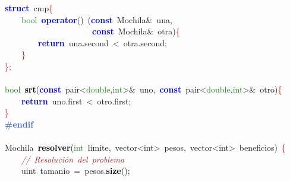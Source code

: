 \mbox{}\textbf{\textcolor{Blue}{struct}}\ \textcolor{TealBlue}{cmp}\textcolor{Red}{\{} \\
\mbox{}\ \ \ \ \textcolor{ForestGreen}{bool}\ \textbf{\textcolor{Blue}{operator}}\textcolor{BrickRed}{()}\ \textcolor{BrickRed}{(}\textbf{\textcolor{Blue}{const}}\ Mochila\textcolor{BrickRed}{\&}\ una\textcolor{BrickRed}{,}\  \\
\mbox{}\ \ \ \ \ \ \ \ \ \ \ \ \ \ \ \ \ \ \ \ \ \textbf{\textcolor{Blue}{const}}\ Mochila\textcolor{BrickRed}{\&}\ otra\textcolor{BrickRed}{)}\textcolor{Red}{\{} \\
\mbox{}\ \ \ \ \ \ \ \ \textbf{\textcolor{Blue}{return}}\ una\textcolor{BrickRed}{.}second\ \textcolor{BrickRed}{\textless{}}\ otra\textcolor{BrickRed}{.}second\textcolor{BrickRed}{;} \\
\mbox{}\ \ \ \ \textcolor{Red}{\}} \\
\mbox{}\textcolor{Red}{\}}\textcolor{BrickRed}{;} \\
\mbox{} \\
\mbox{}\textcolor{ForestGreen}{bool}\ \textbf{\textcolor{Black}{srt}}\textcolor{BrickRed}{(}\textbf{\textcolor{Blue}{const}}\ pair\textcolor{BrickRed}{\textless{}}\textcolor{ForestGreen}{double}\textcolor{BrickRed}{,}\textcolor{ForestGreen}{int}\textcolor{BrickRed}{\textgreater{}\&}\ uno\textcolor{BrickRed}{,}\ \textbf{\textcolor{Blue}{const}}\ pair\textcolor{BrickRed}{\textless{}}\textcolor{ForestGreen}{double}\textcolor{BrickRed}{,}\textcolor{ForestGreen}{int}\textcolor{BrickRed}{\textgreater{}\&}\ otro\textcolor{BrickRed}{)}\textcolor{Red}{\{} \\
\mbox{}\ \ \ \ \textbf{\textcolor{Blue}{return}}\ uno\textcolor{BrickRed}{.}first\ \textcolor{BrickRed}{\textless{}}\ otro\textcolor{BrickRed}{.}first\textcolor{BrickRed}{;} \\
\mbox{}\textcolor{Red}{\}} \\
\mbox{}\textbf{\textcolor{RoyalBlue}{\#endif}} \\
\mbox{} \\
\mbox{}\textcolor{TealBlue}{Mochila}\ \textbf{\textcolor{Black}{resolver}}\textcolor{BrickRed}{(}\textcolor{ForestGreen}{int}\ limite\textcolor{BrickRed}{,}\ \textcolor{TealBlue}{vector\textless{}int\textgreater{}\ pesos,\ vector\textless{}int\textgreater{}}\ beneficios\textcolor{BrickRed}{)}\ \textcolor{Red}{\{} \\
\mbox{}\ \ \ \ \textit{\textcolor{Brown}{//\ Resolución\ del\ problema}} \\
\mbox{}\ \ \ \ \textcolor{TealBlue}{uint}\ tamanio\ \textcolor{BrickRed}{=}\ pesos\textcolor{BrickRed}{.}\textbf{\textcolor{Black}{size}}\textcolor{BrickRed}{();} \\
